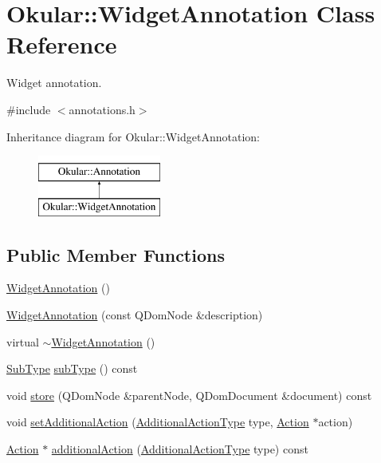 \hypertarget{classOkular_1_1WidgetAnnotation}{\section{Okular\+:\+:Widget\+Annotation Class Reference}
\label{classOkular_1_1WidgetAnnotation}
}


Widget annotation.  




{\ttfamily \#include $<$annotations.\+h$>$}

Inheritance diagram for Okular\+:\+:Widget\+Annotation\+:\begin{figure}[H]
\begin{center}
\leavevmode
\includegraphics[height=2.000000cm]{classOkular_1_1WidgetAnnotation}
\end{center}
\end{figure}
\subsection*{Public Member Functions}
\begin{DoxyCompactItemize}
\item 
\hyperlink{classOkular_1_1WidgetAnnotation_a78542decf4fca84bef5e8a8dd7351825}{Widget\+Annotation} ()
\item 
\hyperlink{classOkular_1_1WidgetAnnotation_acb49f25efc6ebee2161c02d928c4c8ed}{Widget\+Annotation} (const Q\+Dom\+Node \&description)
\item 
virtual \hyperlink{classOkular_1_1WidgetAnnotation_ab840c2183e571a2489b7ac69319cd385}{$\sim$\+Widget\+Annotation} ()
\item 
\hyperlink{classOkular_1_1Annotation_af71b46e37d5f850b97d5c4de3be9aac0}{Sub\+Type} \hyperlink{classOkular_1_1WidgetAnnotation_a68fbdb039e9ce2f7c4a8b1847cf2c205}{sub\+Type} () const 
\item 
void \hyperlink{classOkular_1_1WidgetAnnotation_a2a65f9c21b35c2c7a9abc3cffe94a76f}{store} (Q\+Dom\+Node \&parent\+Node, Q\+Dom\+Document \&document) const 
\item 
void \hyperlink{classOkular_1_1WidgetAnnotation_a94c770062f4b768a374a723cc42615e9}{set\+Additional\+Action} (\hyperlink{classOkular_1_1Annotation_aa34152e337b1cb13e9327f37fc295057}{Additional\+Action\+Type} type, \hyperlink{classOkular_1_1Action}{Action} $\ast$action)
\item 
\hyperlink{classOkular_1_1Action}{Action} $\ast$ \hyperlink{classOkular_1_1WidgetAnnotation_aed09f3028bbe24d472d2d7cee3bffde1}{additional\+Action} (\hyperlink{classOkular_1_1Annotation_aa34152e337b1cb13e9327f37fc295057}{Additional\+Action\+Type} type) const 
\end{DoxyCompactItemize}
